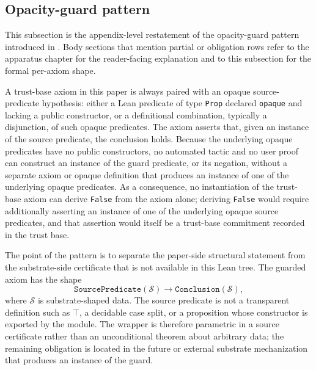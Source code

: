 \documentclass[11pt]{article}
\theoremstyle{definition}
\begin{document}
\subsection{Opacity-guard pattern}\label{subsec:opacity-guard-pattern}

This subsection is the appendix-level restatement of the opacity-guard
pattern introduced in . Body sections that mention
partial or obligation rows refer to the apparatus chapter for the
reader-facing explanation and to this subsection for the formal
per-axiom shape.

A trust-base axiom in this paper is always paired with an opaque
source-predicate hypothesis: either a Lean predicate of type
\texttt{Prop} declared \texttt{opaque} and lacking a public constructor,
or a definitional combination, typically a disjunction, of such opaque
predicates. The axiom asserts that, given an instance of the source
predicate, the conclusion holds. Because the underlying opaque
predicates have no public constructors, no automated tactic and no user
proof can construct an instance of the guard predicate, or its negation,
without a separate axiom or opaque definition that produces an instance
of one of the underlying opaque predicates. As a consequence, no
instantiation of the trust-base axiom can derive \texttt{False} from the
axiom alone; deriving \texttt{False} would require additionally asserting
an instance of one of the underlying opaque source predicates, and that
assertion would itself be a trust-base commitment recorded in the trust
base.

The point of the pattern is to separate the paper-side structural
statement from the substrate-side certificate that is not available in
this Lean tree. The guarded axiom has the shape
\[
  \texttt{SourcePredicate}(\mathcal S) \to
  \texttt{Conclusion}(\mathcal S),
\]
where \(\mathcal S\) is substrate-shaped data. The source predicate is
not a transparent definition such as \(\top\), a decidable case split,
or a proposition whose constructor is exported by the module. The
wrapper is therefore parametric in a source certificate rather than an
unconditional theorem about arbitrary data; the remaining obligation is
located in the future or external substrate mechanization that produces
an instance of the guard.
\end{document}
